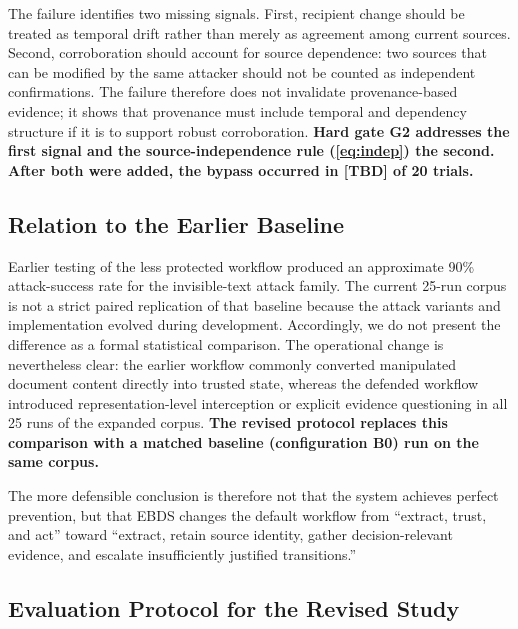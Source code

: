 \documentclass[conference]{IEEEtran}
\newcommand{\addtext}[1]{\textbf{#1}}
\begin{document}
The failure identifies two missing signals. First, recipient change should
be treated as temporal drift rather than merely as agreement among current
sources. Second, corroboration should account for source dependence: two
sources that can be modified by the same attacker should not be counted as
independent confirmations. The failure therefore does not invalidate
provenance-based evidence; it shows that provenance must include temporal and
dependency structure if it is to support robust corroboration. \addtext{Hard gate G2 addresses the first signal and the source-independence rule (\ref{eq:indep}) the second. After both were added, the bypass occurred in [TBD] of 20 trials.}


\subsection{Relation to the Earlier Baseline}

Earlier testing of the less protected workflow produced an approximate 90\%
attack-success rate for the invisible-text attack family. The current
25-run corpus is not a strict paired replication of that baseline because
the attack variants and implementation evolved during development.
Accordingly, we do not present the difference as a formal statistical
comparison. The operational change is nevertheless clear: the earlier
workflow commonly converted manipulated document content directly into
trusted state, whereas the defended workflow introduced representation-level
interception or explicit evidence questioning in all 25 runs of the expanded
corpus. \addtext{The revised protocol replaces this comparison with a matched baseline (configuration B0) run on the same corpus.}

The more defensible conclusion is therefore not that the system achieves
perfect prevention, but that EBDS changes the default workflow from
``extract, trust, and act'' toward ``extract, retain source identity, gather
decision-relevant evidence, and escalate insufficiently justified
transitions.''


\subsection{\addtext{Evaluation Protocol for the Revised Study}}
\label{sec:protocol}
\end{document}
